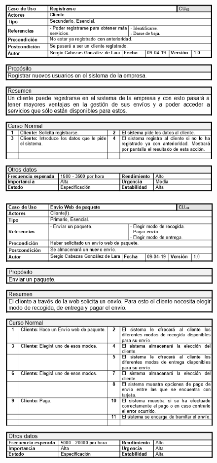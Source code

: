 \begin{figure}[H]
	\centering
	\includegraphics[width=16cm]{53}
\end{figure}
\begin{figure}[H]
	\centering
	\includegraphics[width=16cm]{54}
\end{figure}

